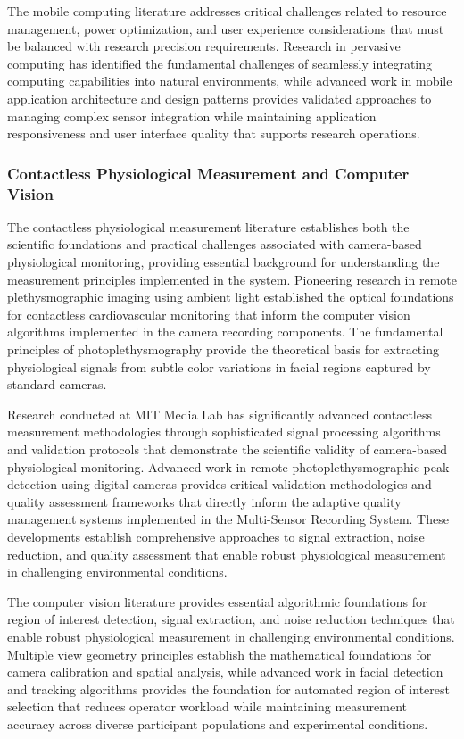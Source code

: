 \documentclass[12pt,a4paper]{report}
\begin{document}
The mobile computing literature addresses critical challenges related to resource management, power optimization, and
user experience considerations that must be balanced with research precision requirements. Research in pervasive
computing has identified the fundamental challenges of seamlessly integrating computing capabilities into natural
environments, while advanced work in mobile application architecture and design patterns provides validated approaches
to managing complex sensor integration while maintaining application responsiveness and user interface quality that
supports research operations.

\subsubsection{Contactless Physiological Measurement and Computer Vision}

The contactless physiological measurement literature establishes both the scientific foundations and practical
challenges associated with camera-based physiological monitoring, providing essential background for understanding the
measurement principles implemented in the system. Pioneering research in remote plethysmographic imaging using ambient
light established the optical foundations for contactless cardiovascular monitoring that inform the computer vision
algorithms implemented in the camera recording components. The fundamental principles of photoplethysmography provide
the theoretical basis for extracting physiological signals from subtle color variations in facial regions captured by
standard cameras.

Research conducted at MIT Media Lab has significantly advanced contactless measurement methodologies through
sophisticated signal processing algorithms and validation protocols that demonstrate the scientific validity of
camera-based physiological monitoring. Advanced work in remote photoplethysmographic peak detection using digital
cameras provides critical validation methodologies and quality assessment frameworks that directly inform the adaptive
quality management systems implemented in the Multi-Sensor Recording System. These developments establish comprehensive
approaches to signal extraction, noise reduction, and quality assessment that enable robust physiological measurement in
challenging environmental conditions.

The computer vision literature provides essential algorithmic foundations for region of interest detection, signal
extraction, and noise reduction techniques that enable robust physiological measurement in challenging environmental
conditions. Multiple view geometry principles establish the mathematical foundations for camera calibration and spatial
analysis, while advanced work in facial detection and tracking algorithms provides the foundation for automated region
of interest selection that reduces operator workload while maintaining measurement accuracy across diverse participant
populations and experimental conditions.
\end{document}
